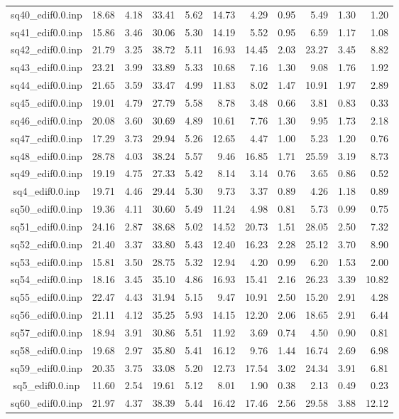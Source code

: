 {\begin{longtable}{@{}cr@{\hspace{1em}}r@{\hspace{1em}}r@{\hspace{1em}}r@{\hspace{1em}}r@{\hspace{2em}}r@{\hspace{1em}}r@{\hspace{1em}}r@{\hspace{1em}}r@{\hspace{1em}}r@{}}
sq40\_edif0.0.inp&18.68&4.18&33.41&5.62&14.73&4.29&0.95&5.49&1.30&1.20\\
sq41\_edif0.0.inp&15.86&3.46&30.06&5.30&14.19&5.52&0.95&6.59&1.17&1.08\\
sq42\_edif0.0.inp&21.79&3.25&38.72&5.11&16.93&14.45&2.03&23.27&3.45&8.82\\
sq43\_edif0.0.inp&23.21&3.99&33.89&5.33&10.68&7.16&1.30&9.08&1.76&1.92\\
sq44\_edif0.0.inp&21.65&3.59&33.47&4.99&11.83&8.02&1.47&10.91&1.97&2.89\\
sq45\_edif0.0.inp&19.01&4.79&27.79&5.58&8.78&3.48&0.66&3.81&0.83&0.33\\
sq46\_edif0.0.inp&20.08&3.60&30.69&4.89&10.61&7.76&1.30&9.95&1.73&2.18\\
sq47\_edif0.0.inp&17.29&3.73&29.94&5.26&12.65&4.47&1.00&5.23&1.20&0.76\\
sq48\_edif0.0.inp&28.78&4.03&38.24&5.57&9.46&16.85&1.71&25.59&3.19&8.73\\
sq49\_edif0.0.inp&19.19&4.75&27.33&5.42&8.14&3.14&0.76&3.65&0.86&0.52\\
sq4\_edif0.0.inp&19.71&4.46&29.44&5.30&9.73&3.37&0.89&4.26&1.18&0.89\\
sq50\_edif0.0.inp&19.36&4.11&30.60&5.49&11.24&4.98&0.81&5.73&0.99&0.75\\
sq51\_edif0.0.inp&24.16&2.87&38.68&5.02&14.52&20.73&1.51&28.05&2.50&7.32\\
sq52\_edif0.0.inp&21.40&3.37&33.80&5.43&12.40&16.23&2.28&25.12&3.70&8.90\\
sq53\_edif0.0.inp&15.81&3.50&28.75&5.32&12.94&4.20&0.99&6.20&1.53&2.00\\
sq54\_edif0.0.inp&18.16&3.45&35.10&4.86&16.93&15.41&2.16&26.23&3.39&10.82\\
sq55\_edif0.0.inp&22.47&4.43&31.94&5.15&9.47&10.91&2.50&15.20&2.91&4.28\\
sq56\_edif0.0.inp&21.11&4.12&35.25&5.93&14.15&12.20&2.06&18.65&2.91&6.44\\
sq57\_edif0.0.inp&18.94&3.91&30.86&5.51&11.92&3.69&0.74&4.50&0.90&0.81\\
sq58\_edif0.0.inp&19.68&2.97&35.80&5.41&16.12&9.76&1.44&16.74&2.69&6.98\\
sq59\_edif0.0.inp&20.35&3.75&33.08&5.20&12.73&17.54&3.02&24.34&3.91&6.81\\
sq5\_edif0.0.inp&11.60&2.54&19.61&5.12&8.01&1.90&0.38&2.13&0.49&0.23\\
sq60\_edif0.0.inp&21.97&4.37&38.39&5.44&16.42&17.46&2.56&29.58&3.88&12.12\\

\end{longtable}}
